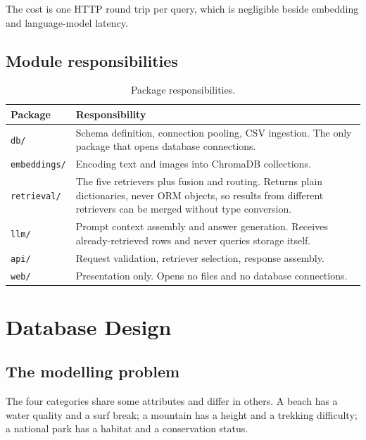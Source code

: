 \documentclass[11pt,a4paper]{article}
\begin{document}
The cost is one HTTP round trip per query, which is negligible beside embedding
and language-model latency.

\subsection{Module responsibilities}

\begin{table}[h]
\centering
\small
\begin{tabular}{lp{10.2cm}}
\toprule
\textbf{Package} & \textbf{Responsibility} \\
\midrule
\texttt{db/}         & Schema definition, connection pooling, CSV ingestion. The only package that opens database connections. \\
\texttt{embeddings/} & Encoding text and images into ChromaDB collections. \\
\texttt{retrieval/}  & The five retrievers plus fusion and routing. Returns plain dictionaries, never ORM objects, so results from different retrievers can be merged without type conversion. \\
\texttt{llm/}        & Prompt context assembly and answer generation. Receives already-retrieved rows and never queries storage itself. \\
\texttt{api/}        & Request validation, retriever selection, response assembly. \\
\texttt{web/}        & Presentation only. Opens no files and no database connections. \\
\bottomrule
\end{tabular}
\caption{Package responsibilities.}
\end{table}

\section{Database Design}

\subsection{The modelling problem}

The four categories share some attributes and differ in others. A beach has a
water quality and a surf break; a mountain has a height and a trekking
difficulty; a national park has a habitat and a conservation status.
\end{document}
